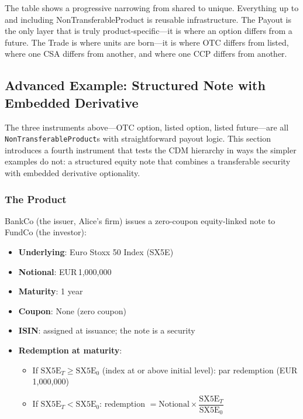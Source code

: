 \documentclass[11pt,a4paper]{article}
\begin{document}
\noindent The table shows a progressive narrowing from shared to unique. Everything up to and including NonTransferableProduct is reusable infrastructure. The Payout is the only layer that is truly product-specific---it is where an option differs from a future. The Trade is where units are born---it is where OTC differs from listed, where one CSA differs from another, and where one CCP differs from another.

\subsection{Advanced Example: Structured Note with Embedded Derivative}
\label{sec:cdm-structured-note}

The three instruments above---OTC option, listed option, listed future---are all \texttt{NonTransferableProduct}s with straightforward payout logic. This section introduces a fourth instrument that tests the CDM hierarchy in ways the simpler examples do not: a structured equity note that combines a transferable security with embedded derivative optionality.

\subsubsection{The Product}
\label{sec:cdm-sn-product}

BankCo (the issuer, Alice's firm) issues a zero-coupon equity-linked note to FundCo (the investor):

\begin{itemize}[nosep]
\item \textbf{Underlying}: Euro Stoxx 50 Index (SX5E)
\item \textbf{Notional}: EUR\,1,000,000
\item \textbf{Maturity}: 1 year
\item \textbf{Coupon}: None (zero coupon)
\item \textbf{ISIN}: assigned at issuance; the note is a security
\item \textbf{Redemption at maturity}:
  \begin{itemize}[nosep]
  \item If $\text{SX5E}_T \geq \text{SX5E}_0$ (index at or above initial level): par redemption (EUR\,1,000,000)
  \item If $\text{SX5E}_T < \text{SX5E}_0$: redemption $= \text{Notional} \times \dfrac{\text{SX5E}_T}{\text{SX5E}_0}$
  \end{itemize}
\end{itemize}
\end{document}

